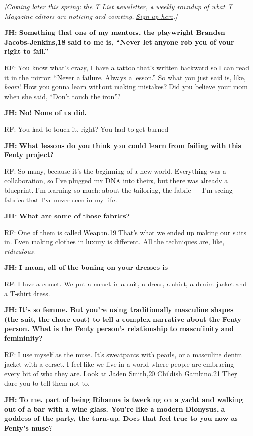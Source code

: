 \emph{{[}Coming later this spring: the T List newsletter, a weekly
roundup of what T Magazine editors are noticing and coveting.}
\href{https://www.nytimes3xbfgragh.onion/newsletters/t-list?module=inline}{\emph{Sign
up here}}\emph{.{]}}

\textbf{JH: Something that one of my mentors, the playwright Branden
Jacobs-Jenkins,18 said to me is, ``Never let anyone rob you of your
right to fail.''}

RF: You know what's crazy, I have a tattoo that's written backward so I
can read it in the mirror: ``Never a failure. Always a lesson.'' So what
you just said is, like, \emph{boom}! How you gonna learn without making
mistakes? Did you believe your mom when she said, ``Don't touch the
iron''?

\textbf{JH: No! None of us did.}

RF: You had to touch it, right? You had to get burned.

\textbf{JH: What lessons do you think you could learn from failing with
this Fenty project?}

RF: So many, because it's the beginning of a new world. Everything was a
collaboration, so I've plugged my DNA into theirs, but there was already
a blueprint. I'm learning so much: about the tailoring, the fabric ---
I'm seeing fabrics that I've never seen in my life.

\textbf{JH: What are some of those fabrics?}

RF: One of them is called Weapon.19 That's what we ended up making our
suits in. Even making clothes in luxury is different. All the techniques
are, like, \emph{ridiculous}.

\textbf{JH: I mean, all of the boning on your dresses is ---}

RF: I love a corset. We put a corset in a suit, a dress, a shirt, a
denim jacket and a T-shirt dress.

\textbf{JH: It's so femme. But you're using traditionally masculine
shapes (the suit, the chore coat) to tell a complex narrative about the
Fenty person. What is the Fenty person's relationship to masculinity and
femininity?}

RF: I use myself as the muse. It's sweatpants with pearls, or a
masculine denim jacket with a corset. I feel like we live in a world
where people are embracing every bit of who they are. Look at Jaden
Smith,20 Childish Gambino.21 They dare you to tell them not to.

\textbf{JH: To me, part of being Rihanna is twerking on a yacht and
walking out of a bar with a wine glass. You're like a modern Dionysus, a
goddess of the party, the turn-up. Does that feel true to you now as
Fenty's muse?}

